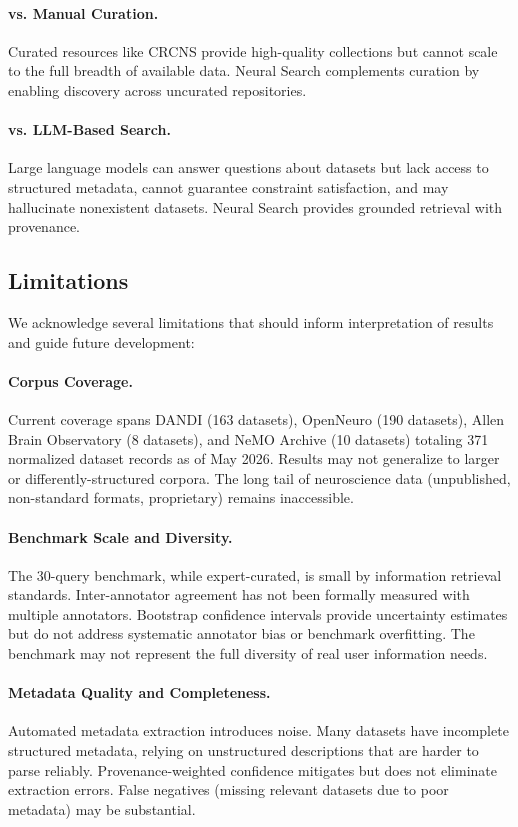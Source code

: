 \documentclass{article}
\theoremstyle{definition}
\begin{document}
\paragraph{vs. Manual Curation.} Curated resources like CRCNS provide high-quality collections but cannot scale to the full breadth of available data. Neural Search complements curation by enabling discovery across uncurated repositories.

\paragraph{vs. LLM-Based Search.} Large language models can answer questions about datasets but lack access to structured metadata, cannot guarantee constraint satisfaction, and may hallucinate nonexistent datasets. Neural Search provides grounded retrieval with provenance.

\subsection{Limitations}

We acknowledge several limitations that should inform interpretation of results and guide future development:

\paragraph{Corpus Coverage.} Current coverage spans DANDI (163 datasets), OpenNeuro (190 datasets), Allen Brain Observatory (8 datasets), and NeMO Archive (10 datasets) totaling 371 normalized dataset records as of May 2026. Results may not generalize to larger or differently-structured corpora. The long tail of neuroscience data (unpublished, non-standard formats, proprietary) remains inaccessible.

\paragraph{Benchmark Scale and Diversity.} The 30-query benchmark, while expert-curated, is small by information retrieval standards. Inter-annotator agreement has not been formally measured with multiple annotators. Bootstrap confidence intervals provide uncertainty estimates but do not address systematic annotator bias or benchmark overfitting. The benchmark may not represent the full diversity of real user information needs.

\paragraph{Metadata Quality and Completeness.} Automated metadata extraction introduces noise. Many datasets have incomplete structured metadata, relying on unstructured descriptions that are harder to parse reliably. Provenance-weighted confidence mitigates but does not eliminate extraction errors. False negatives (missing relevant datasets due to poor metadata) may be substantial.
\end{document}
